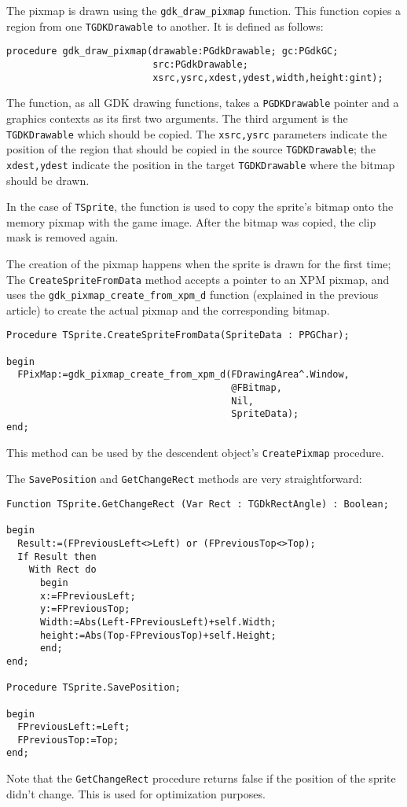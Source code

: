 \documentclass[10pt]{article}
\newcommand{\var}[1]{\texttt{#1}}
\begin{document}
The pixmap is drawn using the \var{gdk\_draw\_pixmap} function. This
function copies a region from one \var{TGDKDrawable} to another.
It is defined as follows:
\begin{verbatim}
procedure gdk_draw_pixmap(drawable:PGdkDrawable; gc:PGdkGC; 
                          src:PGdkDrawable; 
                          xsrc,ysrc,xdest,ydest,width,height:gint);
\end{verbatim}
The function, as all GDK drawing functions, takes a \var{PGDKDrawable} 
pointer and a graphics contexts as its first two arguments. The third
argument is the \var{TGDKDrawable} which should be copied. The
\var{xsrc,ysrc} parameters indicate the position of the region that should
be copied in the source \var{TGDKDrawable}; the \var{xdest,ydest} indicate 
the position in the target \var{TGDKDrawable} where the bitmap should be
drawn.

In the case of \var{TSprite}, the function is used to copy the sprite's 
bitmap onto the memory pixmap with the game image. After the bitmap was
copied, the clip mask is removed again.

The creation of the pixmap happens when the sprite is drawn for the first
time; The \var{CreateSpriteFromData} method accepts a pointer to an XPM
pixmap, and uses the \var{gdk\_pixmap\_create\_from\_xpm\_d} function
(explained in the previous article) to create the actual pixmap and the 
corresponding bitmap.
\begin{verbatim}
Procedure TSprite.CreateSpriteFromData(SpriteData : PPGChar);

begin
  FPixMap:=gdk_pixmap_create_from_xpm_d(FDrawingArea^.Window, 
                                        @FBitmap,
                                        Nil,
                                        SpriteData);
end;
\end{verbatim}
This method can be used by the descendent object's \var{CreatePixmap} 
procedure.

The \var{SavePosition} and \var{GetChangeRect} methods are very
straightforward:
\begin{verbatim}
Function TSprite.GetChangeRect (Var Rect : TGDkRectAngle) : Boolean;

begin
  Result:=(FPreviousLeft<>Left) or (FPreviousTop<>Top);
  If Result then
    With Rect do
      begin
      x:=FPreviousLeft;
      y:=FPreviousTop;
      Width:=Abs(Left-FPreviousLeft)+self.Width;
      height:=Abs(Top-FPreviousTop)+self.Height;
      end;
end;

Procedure TSprite.SavePosition;

begin
  FPreviousLeft:=Left;
  FPreviousTop:=Top;
end;
\end{verbatim}
Note that the \var{GetChangeRect} procedure returns false if the position
of the sprite didn't change. This is used for optimization purposes.
\end{document}
